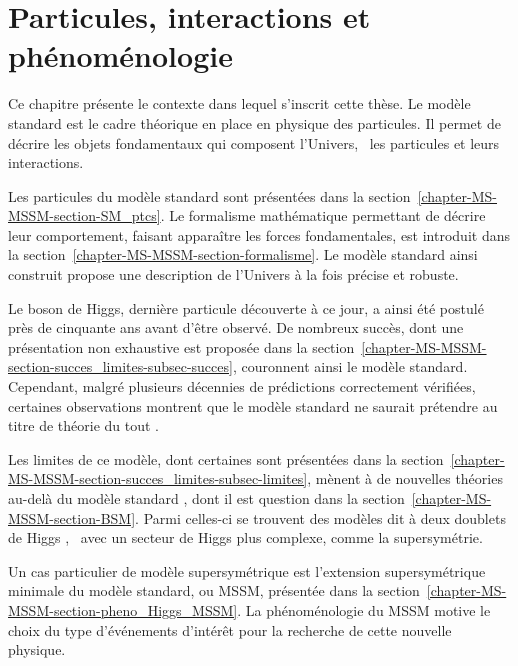 \chapter{Particules, interactions et phénoménologie}\label{chapter-MS-MSSM}

Ce chapitre présente le contexte dans lequel s'inscrit cette thèse.
Le modèle standard est le cadre théorique en place en physique des particules. Il permet de décrire les objets fondamentaux qui composent l'Univers,
\ie\ les particules et leurs interactions.
\par Les particules du modèle standard sont présentées dans la section~\ref{chapter-MS-MSSM-section-SM_ptcs}.
Le formalisme mathématique permettant de décrire leur comportement, faisant apparaître les forces fondamentales, est introduit dans la section~\ref{chapter-MS-MSSM-section-formalisme}.
Le modèle standard ainsi construit propose une description de l'Univers à la fois précise et robuste.
\par Le boson de Higgs, dernière particule découverte à ce jour, a ainsi été postulé près de cinquante ans avant d'être observé. De nombreux succès, dont une présentation non exhaustive est proposée dans la section~\ref{chapter-MS-MSSM-section-succes_limites-subsec-succes}, couronnent ainsi le modèle standard.
Cependant, malgré plusieurs décennies de prédictions correctement vérifiées, certaines observations montrent que le modèle standard ne saurait prétendre au titre de \og théorie du tout \fg{}.
\par Les limites de ce modèle, dont certaines sont présentées dans la section~\ref{chapter-MS-MSSM-section-succes_limites-subsec-limites}, mènent à de nouvelles théories \og au-delà du modèle standard \fg{}, dont il est question dans la section~\ref{chapter-MS-MSSM-section-BSM}. Parmi celles-ci se trouvent des modèles dit \og à deux doublets de Higgs \fg, \ie\ avec un secteur de Higgs plus complexe, comme la supersymétrie.
\par
Un cas particulier de modèle supersymétrique est 
l'extension supersymétrique minimale du modèle standard,
ou MSSM,
présentée dans la section~\ref{chapter-MS-MSSM-section-pheno_Higgs_MSSM}.
La phénoménologie du MSSM motive le choix du type d'événements d'intérêt pour la recherche de cette nouvelle physique.












